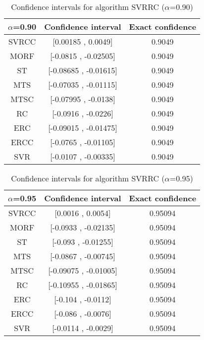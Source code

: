 \documentclass[a4paper,10pt]{article}
\begin{document}
\begin{table}[!htp]
\centering\small
\begin{tabular}{
|c|c|c|}
\hline
 $\alpha$=0.90 & Confidence interval & Exact confidence \\ \hline 
SVRCC & [0.00185 , 0.0049] & 0.9049\\ \hline 
MORF & [-0.0815 , -0.02505] & 0.9049\\ \hline 
ST & [-0.08685 , -0.01615] & 0.9049\\ \hline 
MTS & [-0.07035 , -0.01115] & 0.9049\\ \hline 
MTSC & [-0.07995 , -0.0138] & 0.9049\\ \hline 
RC & [-0.0916 , -0.0226] & 0.9049\\ \hline 
ERC & [-0.09015 , -0.01475] & 0.9049\\ \hline 
ERCC & [-0.0765 , -0.01105] & 0.9049\\ \hline 
SVR & [-0.0107 , -0.00335] & 0.9049\\ \hline 

\end{tabular}
\caption{Confidence intervals for algorithm SVRRC ($\alpha$=0.90)}
\end{table}
\begin{table}[!htp]
\centering\small
\begin{tabular}{
|c|c|c|}
\hline
 $\alpha$=0.95 & Confidence interval & Exact confidence \\ \hline 
SVRCC & [0.0016 , 0.0054] & 0.95094\\ \hline 
MORF & [-0.0933 , -0.02135] & 0.95094\\ \hline 
ST & [-0.093 , -0.01255] & 0.95094\\ \hline 
MTS & [-0.0867 , -0.00745] & 0.95094\\ \hline 
MTSC & [-0.09075 , -0.01005] & 0.95094\\ \hline 
RC & [-0.10955 , -0.01865] & 0.95094\\ \hline 
ERC & [-0.104 , -0.0112] & 0.95094\\ \hline 
ERCC & [-0.086 , -0.0076] & 0.95094\\ \hline 
SVR & [-0.0114 , -0.0029] & 0.95094\\ \hline 

\end{tabular}
\caption{Confidence intervals for algorithm SVRRC ($\alpha$=0.95)}
\end{table}

 \clearpage 
\end{document}
